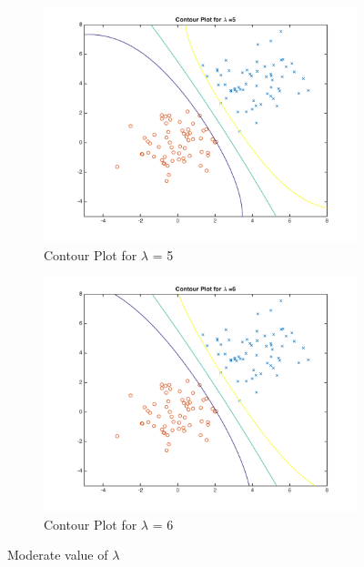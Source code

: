 \documentclass[english]{article}
\begin{document}
\begin{figure}[!htbp]
\begin{subfigure}{0.48\textwidth}
\includegraphics[width=\linewidth]{../plotLambda/plot_5}
\caption{Contour Plot for $\lambda$ = 5} 
\end{subfigure}\hspace*{\fill}
\begin{subfigure}{0.48\textwidth}
\includegraphics[width=\linewidth]{../plotLambda/plot_6}
\caption{Contour Plot for $\lambda$ = 6} \label{fig:b}
\end{subfigure}
\caption{Moderate value of $\lambda$} \label{fig:1}
\end{figure}
\end{document}
